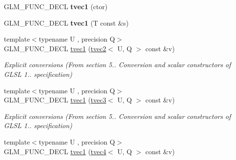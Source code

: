 \begin{DoxyCompactItemize}
\item 
\hypertarget{structglm_1_1tvec1_a61d1e0344299ba644e970e587bb62871}{G\-L\-M\-\_\-\-F\-U\-N\-C\-\_\-\-D\-E\-C\-L {\bfseries tvec1} (ctor)}\label{structglm_1_1tvec1_a61d1e0344299ba644e970e587bb62871}

\item 
\hypertarget{structglm_1_1tvec1_a629b8f164a9bb790e8b7047ab04034fe}{G\-L\-M\-\_\-\-F\-U\-N\-C\-\_\-\-D\-E\-C\-L {\bfseries tvec1} (T const \&s)}\label{structglm_1_1tvec1_a629b8f164a9bb790e8b7047ab04034fe}

\item 
\hypertarget{structglm_1_1tvec1_a8851910a8c3a76c5af513069af86c5f9}{{\footnotesize template$<$typename U , precision Q$>$ }\\G\-L\-M\-\_\-\-F\-U\-N\-C\-\_\-\-D\-E\-C\-L \hyperlink{structglm_1_1tvec1_a8851910a8c3a76c5af513069af86c5f9}{tvec1} (\hyperlink{structglm_1_1tvec2}{tvec2}$<$ U, Q $>$ const \&v)}\label{structglm_1_1tvec1_a8851910a8c3a76c5af513069af86c5f9}

\begin{DoxyCompactList}\small\item\em Explicit conversions (From section 5.. Conversion and scalar constructors of G\-L\-S\-L 1.. specification) \end{DoxyCompactList}\item 
\hypertarget{structglm_1_1tvec1_a680bd254cdc4777fc964b2bc96be2429}{{\footnotesize template$<$typename U , precision Q$>$ }\\G\-L\-M\-\_\-\-F\-U\-N\-C\-\_\-\-D\-E\-C\-L \hyperlink{structglm_1_1tvec1_a680bd254cdc4777fc964b2bc96be2429}{tvec1} (\hyperlink{structglm_1_1tvec3}{tvec3}$<$ U, Q $>$ const \&v)}\label{structglm_1_1tvec1_a680bd254cdc4777fc964b2bc96be2429}

\begin{DoxyCompactList}\small\item\em Explicit conversions (From section 5.. Conversion and scalar constructors of G\-L\-S\-L 1.. specification) \end{DoxyCompactList}\item 
\hypertarget{structglm_1_1tvec1_ab987fb10b4d96f02fe57a8f27fe009b3}{{\footnotesize template$<$typename U , precision Q$>$ }\\G\-L\-M\-\_\-\-F\-U\-N\-C\-\_\-\-D\-E\-C\-L \hyperlink{structglm_1_1tvec1_ab987fb10b4d96f02fe57a8f27fe009b3}{tvec1} (\hyperlink{structglm_1_1tvec4}{tvec4}$<$ U, Q $>$ const \&v)}\label{structglm_1_1tvec1_ab987fb10b4d96f02fe57a8f27fe009b3}


\end{DoxyCompactItemize}
